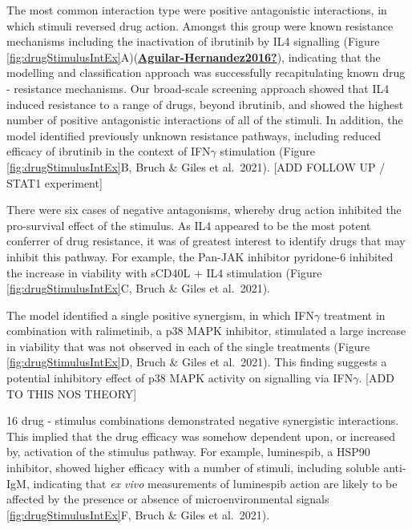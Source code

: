 \documentclass[11pt, a4paper, twosided]{book}
\begin{document}
The most common interaction type were positive antagonistic interactions, in which stimuli reversed drug action. Amongst this group were known resistance mechanisms including the inactivation of ibrutinib by IL4 signalling (Figure \ref{fig:drugStimulusIntEx}A)(\protect\hyperlink{ref-Aguilar-Hernandez2016}{\textbf{Aguilar-Hernandez2016?}}), indicating that the modelling and classification approach was successfully recapitulating known drug - resistance mechanisms. Our broad-scale screening approach showed that IL4 induced resistance to a range of drugs, beyond ibrutinib, and showed the highest number of positive antagonistic interactions of all of the stimuli. In addition, the model identified previously unknown resistance pathways, including reduced efficacy of ibrutinib in the context of IFN\(\gamma\) stimulation (Figure \ref{fig:drugStimulusIntEx}B, Bruch \& Giles et al.~2021). {[}ADD FOLLOW UP / STAT1 experiment{]}

There were six cases of negative antagonisms, whereby drug action inhibited the pro-survival effect of the stimulus. As IL4 appeared to be the most potent conferrer of drug resistance, it was of greatest interest to identify drugs that may inhibit this pathway. For example, the Pan-JAK inhibitor pyridone-6 inhibited the increase in viability with sCD40L + IL4 stimulation (Figure \ref{fig:drugStimulusIntEx}C, Bruch \& Giles et al.~2021).

The model identified a single positive synergism, in which IFN\(\gamma\) treatment in combination with ralimetinib, a p38 MAPK inhibitor, stimulated a large increase in viability that was not observed in each of the single treatments (Figure \ref{fig:drugStimulusIntEx}D, Bruch \& Giles et al.~2021). This finding suggests a potential inhibitory effect of p38 MAPK activity on signalling via IFN\(\gamma\). {[}ADD TO THIS NOS THEORY{]}

16 drug - stimulus combinations demonstrated negative synergistic interactions. This implied that the drug efficacy was somehow dependent upon, or increased by, activation of the stimulus pathway. For example, luminespib, a HSP90 inhibitor, showed higher efficacy with a number of stimuli, including soluble anti-IgM, indicating that \emph{ex vivo} measurements of luminespib action are likely to be affected by the presence or absence of microenvironmental signals \ref{fig:drugStimulusIntEx}F, Bruch \& Giles et al.~2021).
\end{document}

